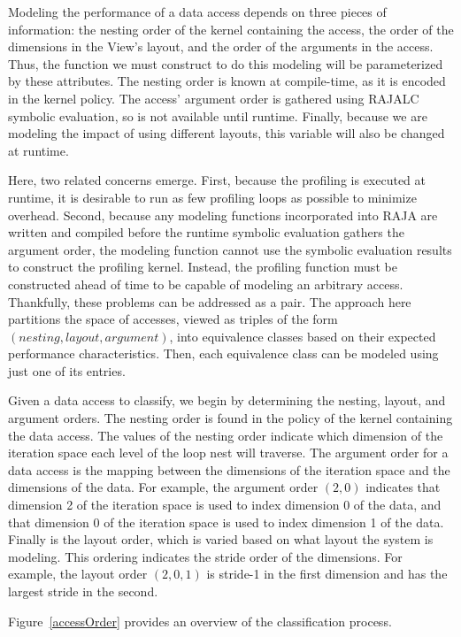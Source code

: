 Modeling the performance of a data access depends on three pieces of information: the nesting order of the kernel containing the access, the order of the dimensions in the View's layout, and the order of the arguments in the access.
Thus, the function we must construct to do this modeling will be parameterized by these attributes.
The nesting order is known at compile-time, as it is encoded in the kernel policy.
The access' argument order is gathered using RAJALC symbolic evaluation, so is not available until runtime.
Finally, because we are modeling the impact of using different layouts, this variable will also be changed at runtime.

Here, two related concerns emerge. 
First, because the profiling is executed at runtime, it is desirable to run as few profiling loops as possible to minimize overhead.
Second, because any modeling functions incorporated into RAJA are written and compiled before the runtime symbolic evaluation gathers the argument order, the modeling function cannot use the symbolic evaluation results to construct the profiling kernel. 
Instead, the profiling function must be constructed ahead of time to be capable of modeling an arbitrary access.
Thankfully, these problems can be addressed as a pair.
The approach here partitions the space of accesses, viewed as triples of the form $(nesting,layout,argument)$, into equivalence classes based on their expected performance characteristics.
Then, each equivalence class can be modeled using just one of its entries.

Given a data access to classify, we begin by determining the nesting, layout, and argument orders.
The nesting order is found in the policy of the kernel containing the data access.
The values of the nesting order indicate which dimension of the iteration space each level of the loop nest will traverse. 
The argument order for a data access is the mapping between the dimensions of the iteration space and the dimensions of the data. 
For example, the argument order $(2,0)$ indicates that dimension 2 of the iteration space is used to index dimension 0 of the data, and that dimension 0 of the iteration space is used to index dimension 1 of the data.
Finally is the layout order, which is varied based on what layout the system is modeling. 
This ordering indicates the stride order of the dimensions.
For example, the layout order $(2,0,1)$ is stride-1 in the first dimension and has the largest stride in the second.

Figure~\ref{accessOrder} provides an overview of the classification process.

